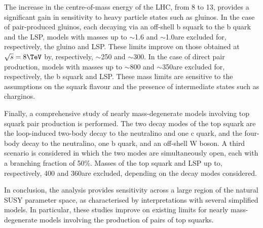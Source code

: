 The increase in the centre-of-mass energy of the LHC, from 8 to
13\TeV, provides a significant gain in sensitivity to heavy particle
states such as gluinos. In the case of pair-produced gluinos, each
decaying via an off-shell b squark to the b quark and the LSP, models
with masses up to $\sim$1.6 and $\sim$1.0\TeV are excluded for,
respectively, the gluino and LSP. These limits improve on those
obtained at $\sqrt{s} = 8\TeV$ by, respectively, $\sim$250 and
$\sim$300\GeV. In the case of direct pair production, models with
masses up to $\sim$800 and $\sim$350\GeV are excluded for,
respectively, the b squark and LSP. These mass limits are sensitive to
the assumptions on the squark flavour and the presence of intermediate
states such as charginos.

Finally, a comprehensive study of nearly mass-degenerate models
involving top squark pair production is performed. The two decay modes
of the top squark are the loop-induced two-body decay to the
neutralino and one c quark, and the four-body decay to the neutralino,
one b quark, and an off-shell W boson. A third scenario is considered
in which the two modes are simultaneously open, each with a branching
fraction of 50\%. Masses of the top squark and LSP up to,
respectively, 400 and 360\GeV are excluded, depending on the decay
modes considered.

In conclusion, the analysis provides sensitivity across a large region
of the natural SUSY parameter space, as characterised by
interpretations with several simplified models. In particular, these
studies improve on existing limits for nearly mass-degenerate models
involving the production of pairs of top squarks.
